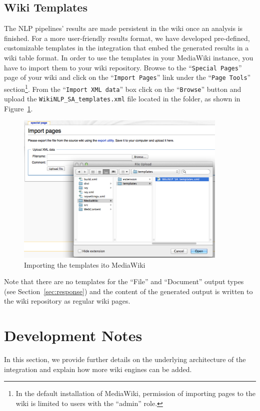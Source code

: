 \subsection{Wiki Templates}
The NLP pipelines' results are made persistent in the wiki once an analysis is finished. For a more user-friendly results format, we have developed pre-defined, customizable templates in the \wikinlp integration that embed the generated results in a wiki table format. In order to use the templates in your MediaWiki instance, you have to import them to your wiki repository. Browse to the ``\texttt{Special Pages}'' page of your wiki and click on the ``\texttt{Import Pages}'' link under the ``\texttt{Page Tools}'' section\footnote{In the default installation of MediaWiki, permission of importing pages to the wiki is limited to users with the ``admin'' role.}. From the ``\texttt{Import XML data}'' box click on the ``\texttt{Browse}'' button and upload the \texttt{WikiNLP\_SA\_templates.xml} file located in the  folder, as shown in Figure~\ref{fig:wiki_template_import}.

\begin{figure}
\centering
\includegraphics[width=0.9\textwidth]{pictures/wiki_template_import.png}
\caption{Importing the \sa templates ito MediaWiki}
\label{fig:wiki_template_import}
\end{figure}

Note that there are no templates for the ``File'' and ``Document'' output types (see Section~\ref{sec:response}) and the content of the generated output is written to the wiki repository as regular wiki pages.

\section{Development Notes}
In this section, we provide further details on the underlying architecture of the \wikinlp integration and explain how more wiki engines can be added.

